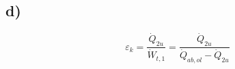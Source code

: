 

\subsection*{d)}
\[
\varepsilon_{k} = \frac{\dot{Q}_{2u}}{\dot{W}_{t,1}} = \frac{\dot{Q}_{2u}}{\dot{Q}_{ab,ol} - \dot{Q}_{2u}}
\]